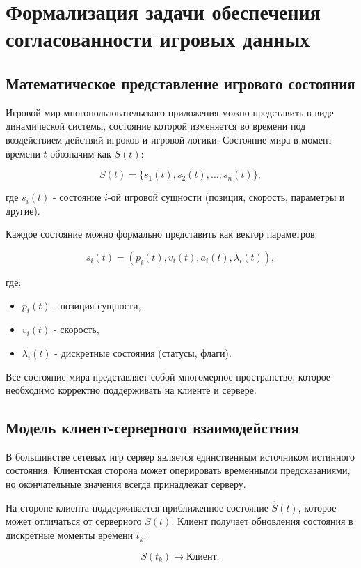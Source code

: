 \chapter{Формализация задачи обеспечения согласованности игровых данных}

\section{Математическое представление игрового состояния}

Игровой мир многопользовательского приложения можно представить в виде динамической системы,
состояние которой изменяется во времени под воздействием действий игроков и игровой логики. 
Состояние мира в момент времени $t$ обозначим как $S(t)$:

\[
S(t) = \{ s_1(t), s_2(t), \ldots, s_n(t) \},
\]

где $s_i(t)$ - состояние $i$-ой игровой сущности (позиция, скорость, параметры и другие).

Каждое состояние можно формально представить как вектор параметров:

\[
s_i(t) = \left( p_i(t), v_i(t), a_i(t), \lambda_i(t) \right),
\]

где:
\begin{itemize}
    \item $p_i(t)$ - позиция сущности,
    \item $v_i(t)$ - скорость,
    \item $\lambda_i(t)$ - дискретные состояния (статусы, флаги).
\end{itemize}

Все состояние мира представляет собой многомерное пространство, которое необходимо корректно поддерживать на клиенте и сервере.

\section{Модель клиент-серверного взаимодействия}

В большинстве сетевых игр сервер является единственным источником истинного состояния. 
Клиентская сторона может оперировать временными предсказаниями, но окончательные значения 
всегда принадлежат серверу.

На стороне клиента поддерживается приближенное состояние $\hat{S}(t)$, которое может отличаться 
от серверного $S(t)$. Клиент получает обновления состояния в дискретные моменты времени $t_k$:

\[
S(t_k) \rightarrow \text{Клиент},
\]

